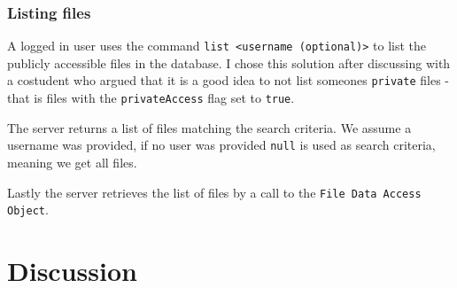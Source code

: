 \documentclass[a4paper]{scrartcl}
\begin{document}
\subsubsection{Listing files}
A logged in user uses the command \texttt{list <username (optional)>} to list the publicly accessible files in the database.
I chose this solution after discussing with a costudent who argued that it is a good idea to not list someones \texttt{private} files - that is files with the \texttt{privateAccess} flag set to \texttt{true}.

The server returns a list of files matching the search criteria. We assume a username was provided, if no user was provided \texttt{null} is used as search criteria, meaning we get all files.

Lastly the server retrieves the list of files by a call to the \texttt{File Data Access Object}.



\section{Discussion}
\end{document}
